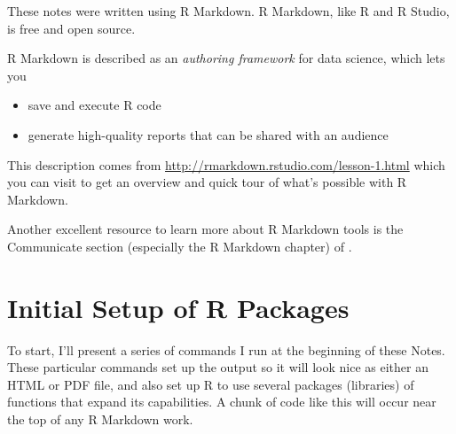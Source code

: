 \documentclass[
]{book}
\newenvironment{Shaded}{\begin{snugshade}}{\end{snugshade}}
\newcommand{\CommentTok}[1]{\textcolor[rgb]{0.56,0.35,0.01}{\textit{#1}}}
\newcommand{\DataTypeTok}[1]{\textcolor[rgb]{0.13,0.29,0.53}{#1}}
\newcommand{\KeywordTok}[1]{\textcolor[rgb]{0.13,0.29,0.53}{\textbf{#1}}}
\newcommand{\NormalTok}[1]{#1}
\newcommand{\OperatorTok}[1]{\textcolor[rgb]{0.81,0.36,0.00}{\textbf{#1}}}
\newcommand{\OtherTok}[1]{\textcolor[rgb]{0.56,0.35,0.01}{#1}}
\providecommand{\tightlist}{%
  \setlength{\itemsep}{0pt}\setlength{\parskip}{0pt}}
\begin{document}
These notes were written using R Markdown. R Markdown, like R and R Studio, is free and open source.

R Markdown is described as an \emph{authoring framework} for data science, which lets you

\begin{itemize}
\tightlist
\item
  save and execute R code
\item
  generate high-quality reports that can be shared with an audience
\end{itemize}

This description comes from \url{http://rmarkdown.rstudio.com/lesson-1.html} which you can visit to get an overview and quick tour of what's possible with R Markdown.

Another excellent resource to learn more about R Markdown tools is the Communicate section (especially the R Markdown chapter) of \citet{R4DS}.

\hypertarget{initial-setup-of-r-packages}{%
\section*{Initial Setup of R Packages}\label{initial-setup-of-r-packages}}

To start, I'll present a series of commands I run at the beginning of these Notes. These particular commands set up the output so it will look nice as either an HTML or PDF file, and also set up R to use several packages (libraries) of functions that expand its capabilities. A chunk of code like this will occur near the top of any R Markdown work.

\begin{Shaded}
\end{Shaded}
\end{document}
